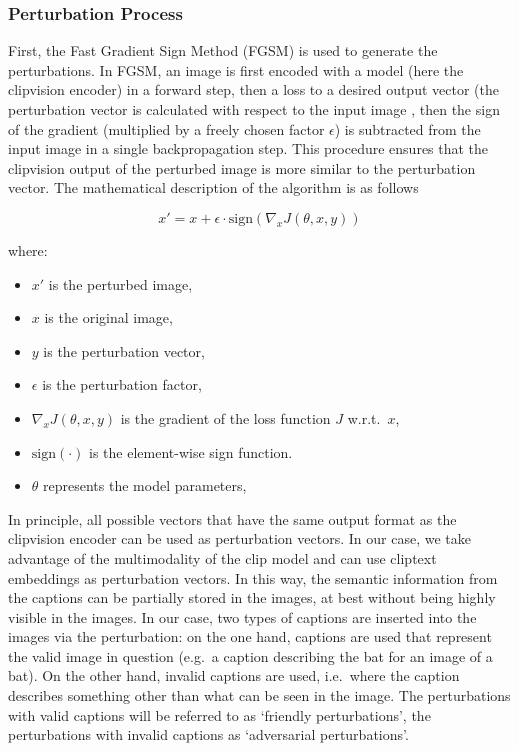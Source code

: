 \subsubsection{Perturbation Process}

First, the Fast Gradient Sign Method\cite{goodfellowExplainingHarnessingAdversarial2014} (FGSM) is used to generate the perturbations. In FGSM, an image is first encoded with a model (here the clipvision encoder) in a forward step, then a loss to a desired output vector (the perturbation vector is calculated with respect to the input image , then the sign of the gradient (multiplied by a freely chosen factor $\epsilon$) is subtracted from the input image in a single backpropagation step. This procedure ensures that the clipvision output of the perturbed image is more similar to the perturbation vector. The mathematical description of the algorithm is as follows

\[
x' = x + \epsilon \cdot \text{sign}(\nabla_x J(\theta, x, y))
\]

where:
\begin{itemize}
    \item \( x' \) is the perturbed image,
    \item \( x \) is the original image,
    \item \( y \) is the perturbation vector,
    \item \( \epsilon \) is the perturbation factor,
    \item \( \nabla_x J(\theta, x, y) \) is the gradient of the loss function \( J \) w.r.t.\ \( x \),
    \item \( \text{sign}(\cdot) \) is the element-wise sign function.
    \item \( \theta \) represents the model parameters,
\end{itemize}

In principle, all possible vectors that have the same output format as the clipvision encoder can be used as perturbation vectors. In our case, we take advantage of the multimodality of the clip model and can use cliptext embeddings as perturbation vectors. In this way, the semantic information from the captions can be partially stored in the images, at best without being highly visible in the images. In our case, two types of captions are inserted into the images via the perturbation: on the one hand, captions are used that represent the valid image in question (e.g.\ a caption describing the bat for an image of a bat). On the other hand, invalid captions are used, i.e.\ where the caption describes something other than what can be seen in the image. The perturbations with valid captions will be referred to as `friendly perturbations', the perturbations with invalid captions as `adversarial perturbations'.

